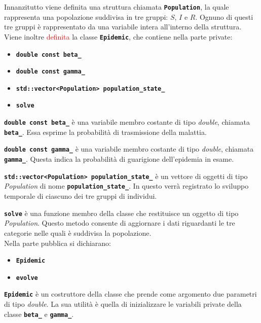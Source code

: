 \documentclass[11pt, a4paper]{article}
\begin{document}
Innanzitutto viene definita una struttura chiamata \textbf{\texttt{Population}}, la quale rappresenta una popolazione suddivisa in tre gruppi: $S$, $I$ e $R$. Ognuno di questi tre gruppi è rappresentato da una variabile intera all'interno della struttura. \\ 

Viene inoltre \textcolor{red}{definita} %
la classe \textbf{\texttt{Epidemic}}, che contiene nella parte private:
\begin{itemize}
    \item \textbf{\texttt{double const beta\_}}
    \item \textbf{\texttt{double const gamma\_}}
    \item \textbf{\texttt{std::vector<Population> population\_state\_}}
    \item \textbf{\texttt{solve}}
\end{itemize}

\textbf{\texttt{double const beta\_}} \`{e} una variabile membro costante di tipo \textit{double}, chiamata \textbf{\texttt{beta\_}}. Essa esprime la probabilit\`{a} di trasmissione della malattia.

\textbf{\texttt{double const gamma\_}} \`{e} una variabile membro costante di tipo \textit{double}, chiamata \textbf{\texttt{gamma\_}}. Questa indica la probabilit\`{a} di guarigione dell'epidemia in esame.

\textbf{\texttt{std::vector<Population> population\_state\_}} \`{e} un vettore di oggetti di tipo \textit{Population} di nome \textbf{\texttt{population\_state\_}}. In questo verr\`{a} registrato lo sviluppo temporale di ciascuno dei tre gruppi di individui.

\textbf{\texttt{solve}} \`{e} una funzione membro della classe che restituisce un oggetto di tipo \textit{Population}. Questo metodo consente di aggiornare i dati riguardanti le tre categorie nelle quali \`{e} suddivisa la popolazione. \\

Nella parte pubblica si dichiarano:
\begin{itemize}
    \item \textbf{\texttt{Epidemic}}
    \item \textbf{\texttt{evolve}}
\end{itemize}

\textbf{\texttt{Epidemic}} \`{e} un costruttore della classe che prende come argomento due parametri di tipo \textit{double}. La sua utilit\`{a} \`{e} quella di inizializzare le variabili private della classe \textbf{\texttt{beta\_}} e \textbf{\texttt{gamma\_}}.
\end{document}
